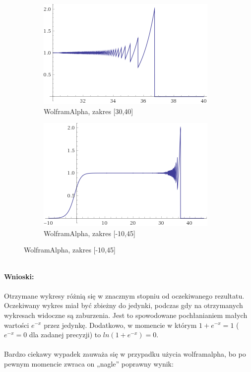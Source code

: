 \documentclass{article}
\begin{document}
\begin{figure}[ht]
	\begin{subfigure}{.5\textwidth}
		\centering
		\includegraphics[width=.8\linewidth]{WolfPlots/Screenshot_2019-11-06 f(x) = (((exp(x)) ((log((1) + (exp(-x))))))) for x range(30,40) - Wolfram Alpha}  
		\caption*{WolframAlpha, zakres [30,40]}

	\end{subfigure}
	\begin{subfigure}{.5\textwidth}
		\centering
		\includegraphics[width=.8\linewidth]{WolfPlots/Screenshot_2019-11-06 f(x) = (((exp(x)) ((log((1) + (exp(-x))))))) for x range(-10,45) - Wolfram Alpha}  
		\caption*{WolframAlpha, zakres [-10,45]}

	\end{subfigure}
\end{figure} \\
\newpage
\noindent \textbf{Wnioski:} \\\\
Otrzymane wykresy różnią się w znacznym stopniu od oczekiwanego rezultatu. Oczekiwany wykres miał być zbieżny do jedynki, podczas gdy na otrzymanych wykresach widoczne są zaburzenia. Jest to spowodowane pochłanianiem małych wartości $e^{-x} $ przez jedynkę. Dodatkowo, w momencie w którym $ 1 + e^{-x} = 1 $ ($e^{-x} = 0$ dla zadanej precyzji) to $ln(1 + e^{-x}) = 0$. \\\\ Bardzo ciekawy wypadek zauważa się w przypadku użycia wolframalpha, bo po pewnym momencie zwraca on „nagle” poprawny wynik:\\
\end{document}

